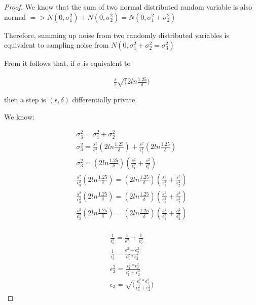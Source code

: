\documentclass{article}
\theoremstyle{remark}
\theoremstyle{definition}
\begin{document}
\begin{proof}

We know that the sum of two normal distributed random variable is also normal $=> N(0, \sigma_{1}^{2}) + N(0, \sigma_{2}^{2}) = N(0, \sigma_{1}^{2} + \sigma_{2}^{2})$	

Therefore, summing up noise from two randomly distributed variables  is equivalent to sampling noise from $N(0, \sigma_{1}^{2} + \sigma_{2}^{2} = \sigma_{3}^{2})$  	

From \cite{Dwork:2014} it follows that, if $\sigma$ is equivalent to

\begin{align*}
	\frac{s}{\epsilon}\sqrt(2ln\frac{1.25}{\delta})
\end{align*}

then a step is $(\epsilon,\delta)$ differentially private.

We know:
	
\begin{gather*}
	\sigma_{3}^{2} = \sigma_{1}^{2} + \sigma_{2}^{2}\\ 
	\sigma_{3}^{2} = \frac{s^{2}}{\epsilon_1^{2}}(2ln\frac{1.25}{\delta}) + \frac{s^{2}}{\epsilon_1^{2}}(2ln\frac{1.25}{\delta}) \\
	\sigma_{3}^{2} = (2ln\frac{1.25}{\delta})(\frac{s^{2}}{\epsilon_{1}^{2}} + \frac{s^{2}}{\epsilon_{1}^{2}})\\ 
	\frac{s^{2}}{\epsilon_{3}^{2}}(2ln\frac{1.25}{\delta}) = (2ln\frac{1.25}{\delta})(\frac{s^{2}}{\epsilon_{1}^{2}} + \frac{s^{2}}{\epsilon_{2}^{2}})\\
	\frac{s^{2}}{\epsilon_{3}^{2}}(2ln\frac{1.25}{\delta}) = (2ln\frac{1.25}{\delta})(\frac{s^{2}}{\epsilon_{1}^{2}} + \frac{s^{2}}{\epsilon_{2}^{2}})\\ 
	\frac{s^{2}}{\epsilon_{3}^{2}}(2ln\frac{1.25}{\delta}) = (2ln\frac{1.25}{\delta})(\frac{s^{2}}{\epsilon_{1}^{2}} + \frac{s^{2}}{\epsilon_{2}^{2}})\\ 	
\end{gather*}

\begin{gather*}
	\frac{1}{\epsilon_{3}^{2}} = \frac{1}{\epsilon_{1}^{2}} + \frac{1}{\epsilon_{2}^{2}}\\
	\frac{1}{\epsilon_{3}^{2}} = \frac{\epsilon_{1}^{2} + \epsilon_{2}^{2}}{\epsilon_{1}^{2} * \epsilon_{2}^{2}}\\
	\epsilon_{3}^{2} = \frac{\epsilon_{1}^{2} * \epsilon_{2}^{2}}{\epsilon_{1}^{2} + \epsilon_{2}^{2}}\\
	\epsilon_{3} = \sqrt(\frac{\epsilon_{1}^{2} * \epsilon_{2}^{2}}{\epsilon_{1}^{2} + \epsilon_{2}^{2}})
\end{gather*}

\end{proof}
\end{document}
